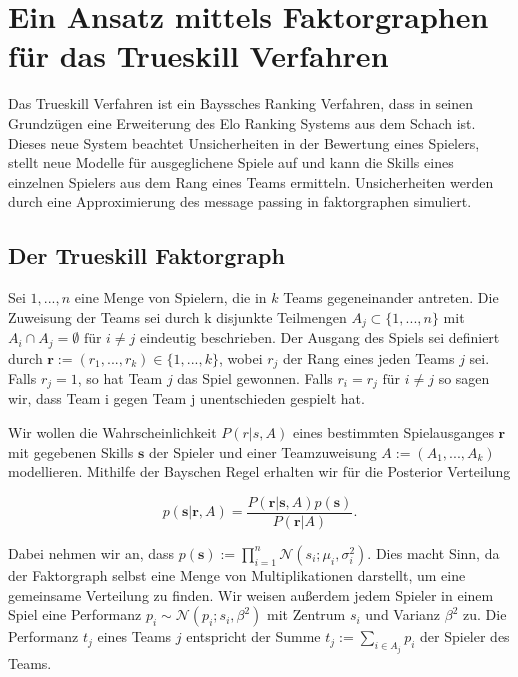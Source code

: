 \documentclass[12pt,a4paper]{scrartcl}
\numberwithin{equation}{section}
\begin{document}
 \newpage  %

\section{Ein Ansatz mittels Faktorgraphen für das Trueskill Verfahren}
Das Trueskill Verfahren ist ein Bayssches Ranking Verfahren, dass in seinen Grundzügen eine Erweiterung des
Elo Ranking Systems aus dem Schach ist. 
Dieses neue System beachtet Unsicherheiten in der Bewertung eines Spielers, stellt neue Modelle für ausgeglichene
Spiele auf und kann die Skills eines einzelnen Spielers aus dem Rang eines Teams ermitteln. 
Unsicherheiten werden durch eine Approximierung des message passing in faktorgraphen simuliert.  

\subsection{Der Trueskill Faktorgraph}

 Sei ${1,...,n}$ eine Menge von Spielern, die in $k$ Teams gegeneinander antreten. Die Zuweisung der Teams sei durch k disjunkte Teilmengen
 $A_j \subset \{1,...,n\}$ mit $A_i \cap A_j = \emptyset \text{ für } i \neq j$ eindeutig beschrieben. Der Ausgang des Spiels sei definiert durch $\mathbf{r} := (r_1,...,r_k) \in \{1,...,k\}$,
 wobei $r_j$ der Rang eines jeden Teams $j$ sei. Falls $r_j = 1$, so hat Team $j$ das Spiel gewonnen. Falls $r_i = r_j \text{ für } i \neq j$ so sagen wir, dass Team i gegen Team j
 unentschieden gespielt hat. 
 
 Wir wollen die Wahrscheinlichkeit $P(r|s,A)$ eines bestimmten Spielausganges $\mathbf{r}$ mit gegebenen Skills $\mathbf{s}$ der Spieler und einer Teamzuweisung $A := (A_1,...,A_k)$ modellieren. 
 Mithilfe der Bayschen Regel erhalten wir für die Posterior Verteilung
 
 \begin{equation}
  p(\mathbf{s}|\mathbf{r},A) = \frac{P(\mathbf{r}|\mathbf{s},A)p(\mathbf{s})}{P(\mathbf{r}|A)}.
 \end{equation}

 Dabei nehmen wir an, dass $p(\mathbf{s}) := \prod_{i = 1}^n \mathcal{N}(s_i;\mu_i,\sigma_i^2)$. Dies macht Sinn, da der Faktorgraph selbst eine Menge von Multiplikationen darstellt, um
 eine gemeinsame Verteilung zu finden. 
 Wir weisen außerdem jedem Spieler in einem Spiel eine Performanz $p_i \sim \mathcal{N}(p_i; s_i,\beta^2)$ mit Zentrum $s_i$ und Varianz $\beta^2$ zu. Die Performanz $t_j$ eines Teams
 $j$ entspricht der Summe $t_j := \sum_{i \in A_j} p_i$ der Spieler des Teams. 
 
\end{document}
